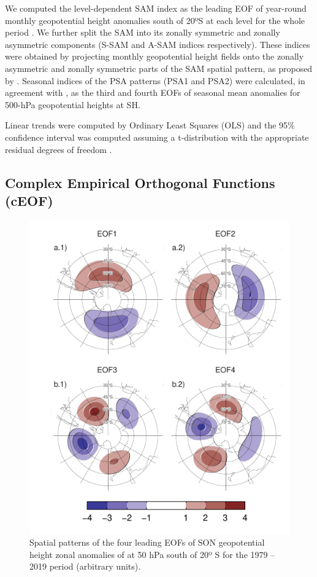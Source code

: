 \documentclass[pdflatex,sn-basic]{sn-jnl}
\theoremstyle{thmstyleone}%
\theoremstyle{thmstyletwo}%
\theoremstyle{thmstylethree}%
\begin{document}
We computed the level-dependent SAM index as the leading EOF of year-round monthly geopotential height anomalies south of 20ºS at each level for the whole period \citep{baldwin2009}.
We further split the SAM into its zonally symmetric and zonally asymmetric components (S-SAM and A-SAM indices respectively).
These indices were obtained by projecting monthly geopotential height fields onto the zonally asymmetric and zonally symmetric parts of the SAM spatial pattern, as proposed by \citet{campitelli2022}.
Seasonal indices of the PSA patterns (PSA1 and PSA2) were calculated, in agreement with \citet{mo2001}, as the third and fourth EOFs of seasonal mean anomalies for 500-hPa geopotential heights at SH.

Linear trends were computed by Ordinary Least Squares (OLS) and the 95\% confidence interval was computed assuming a t-distribution with the appropriate residual degrees of freedom \citep{wilks2011}.

\hypertarget{complex-empirical-orthogonal-functions-ceof}{%
\subsection{Complex Empirical Orthogonal Functions (cEOF)}\label{complex-empirical-orthogonal-functions-ceof}}



\begin{figure}
\centering
\includegraphics{../figures/eof-naive-1.pdf}
\caption{\label{fig:eof-naive}Spatial patterns of the four leading EOFs of SON geopotential height zonal anomalies of at 50 hPa south of 20º S for the 1979 -- 2019 period (arbitrary units).}
\end{figure}
\end{document}
